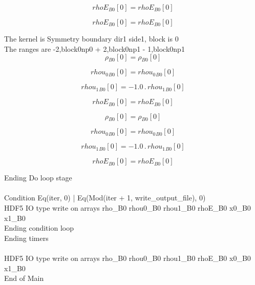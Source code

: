 \documentclass{article}
\begin{document}
\begin{dmath}{rhoE{_{B0}}}[{0}] = {rhoE{_{B0}}}[{0}]\end{dmath}

\begin{dmath}{rhoE{_{B0}}}[{0}] = {rhoE{_{B0}}}[{0}]\end{dmath}

\noindent The kernel is Symmetry boundary dir1 side1, block is 0\\\noindent The ranges are -2,block0np0 + 2,block0np1 - 1,block0np1\\\begin{dmath}{\rho{_{B0}}}[{0}] = {\rho{_{B0}}}[{0}]\end{dmath}

\begin{dmath}{rhou_{0}{_{B0}}}[{0}] = {rhou_{0}{_{B0}}}[{0}]\end{dmath}

\begin{dmath}{rhou_{1}{_{B0}}}[{0}] = - 1.0 \,.\, {rhou_{1}{_{B0}}}[{0}]\end{dmath}

\begin{dmath}{rhoE{_{B0}}}[{0}] = {rhoE{_{B0}}}[{0}]\end{dmath}

\begin{dmath}{\rho{_{B0}}}[{0}] = {\rho{_{B0}}}[{0}]\end{dmath}

\begin{dmath}{rhou_{0}{_{B0}}}[{0}] = {rhou_{0}{_{B0}}}[{0}]\end{dmath}

\begin{dmath}{rhou_{1}{_{B0}}}[{0}] = - 1.0 \,.\, {rhou_{1}{_{B0}}}[{0}]\end{dmath}

\begin{dmath}{rhoE{_{B0}}}[{0}] = {rhoE{_{B0}}}[{0}]\end{dmath}

\noindent Ending Do loop stage\\
\\\noindent Condition Eq(iter, 0) | Eq(Mod(iter + 1, write_output_file), 0)\\\noindent HDF5 IO type write on arrays rho_B0 rhou0_B0 rhou1_B0 rhoE_B0 x0_B0 x1_B0\\\noindent Ending condition loop %
\\\noindent Ending timers\\
\\\noindent HDF5 IO type write on arrays rho_B0 rhou0_B0 rhou1_B0 rhoE_B0 x0_B0 x1_B0\\\noindent End of Main\\
\end{document}
